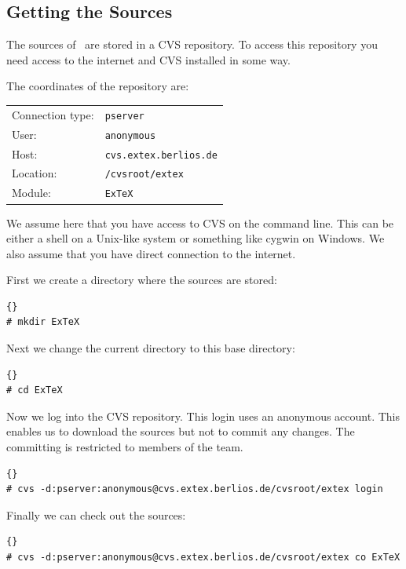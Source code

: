 \documentclass{extex-doc}
\begin{document}
\INCOMPLETE


\subsection{Getting the Sources}

The sources of \ExTeX\ are stored in a CVS repository. To access this
repository you need access to the internet and CVS installed in some
way.


The coordinates of the repository are:
\medskip

\begin{tabular}{ll}\toprule
  Connection type: & \texttt{pserver}			\\
  User:		   & \texttt{anonymous}			\\
  Host:		   & \texttt{cvs.extex.berlios.de}	\\
  Location:	   & \texttt{/cvsroot/extex}		\\
  Module:	   & \texttt{ExTeX}			\\\bottomrule
\end{tabular}
\bigskip

We assume here that you have access to CVS on the command line. This
can be either a shell on a Unix-like system or something like cygwin on
Windows. We also assume that you have direct connection to the internet.

First we create a directory where the sources are stored:
\begin{lstlisting}{}
# mkdir ExTeX
\end{lstlisting}

Next we change the current directory to this base directory:
\begin{lstlisting}{}
# cd ExTeX
\end{lstlisting}

Now we log into the CVS repository. This login uses an anonymous
account. This enables us to download the sources but not to commit any
changes. The committing is restricted to members of the \ExTeX{} team.
\begin{lstlisting}{}
# cvs -d:pserver:anonymous@cvs.extex.berlios.de/cvsroot/extex login
\end{lstlisting}

Finally we can check out the sources:
\begin{lstlisting}{}
# cvs -d:pserver:anonymous@cvs.extex.berlios.de/cvsroot/extex co ExTeX
\end{lstlisting}
\end{document}
